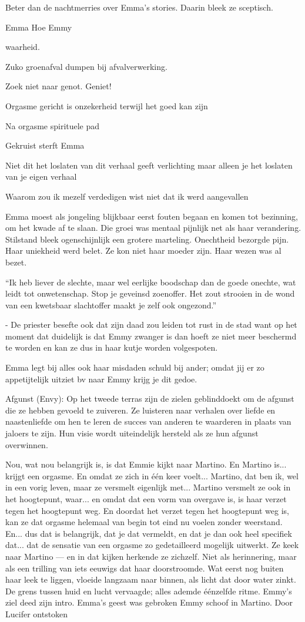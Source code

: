 Beter dan de nachtmerries
over Emma’s stories.
Daarin bleek ze sceptisch.

Emma
Hoe Emmy

waarheid.

Zuko groenafval dumpen bij afvalverwerking.

Zoek niet naar genot. Geniet!

Orgasme gericht is onzekerheid terwijl het goed kan zijn

Na orgasme spirituele pad

Gekruist sterft Emma

Niet dit het loslaten van dit verhaal geeft verlichting maar alleen je het loslaten van je eigen verhaal

Waarom zou ik mezelf verdedigen wist niet dat ik werd aangevallen

Emma moest als jongeling blijkbaar eerst fouten begaan en komen tot bezinning, om het kwade af te slaan. Die groei was mentaal pijnlijk net als haar verandering. Stilstand bleek ogenschijnlijk een grotere marteling. Onechtheid bezorgde pijn. Haar uniekheid werd belet. Ze kon niet haar moeder zijn. Haar wezen was al bezet.

“Ik heb liever de slechte, maar wel eerlijke boodschap dan de goede onechte, wat leidt tot onwetenschap. Stop je geveinsd zoenoffer. Het zout strooien in de wond van een kwetsbaar slachtoffer maakt je zelf ook ongezond.”

- De priester besefte ook dat zijn daad zou leiden tot rust in de stad want op het moment dat duidelijk is dat Emmy zwanger is dan hoeft ze niet meer beschermd te worden en kan ze dus in haar kutje worden volgespoten.

Emma legt bij alles ook haar misdaden schuld bij ander; omdat jij er zo appetijtelijk uitziet bv naar Emmy krijg je dit gedoe.

Afgunst (Envy): Op het tweede terras zijn de zielen geblinddoekt om de afgunst die ze hebben gevoeld te zuiveren. Ze luisteren naar verhalen over liefde en naastenliefde om hen te leren de succes van anderen te waarderen in plaats van jaloers te zijn. Hun visie wordt uiteindelijk hersteld als ze hun afgunst overwinnen.

Nou, wat nou belangrijk is, is dat Emmie kijkt naar Martino. En Martino is... krijgt een orgasme. En omdat ze zich in één keer voelt... Martino, dat ben ik, wel in een vorig leven, maar ze versmelt eigenlijk met... Martino versmelt ze ook in het hoogtepunt, waar... en omdat dat een vorm van overgave is, is haar verzet tegen het hoogtepunt weg. En doordat het verzet tegen het hoogtepunt weg is, kan ze dat orgasme helemaal van begin tot eind nu voelen zonder weerstand. En... dus dat is belangrijk, dat je dat vermeldt, en dat je dan ook heel specifiek dat... dat de sensatie van een orgasme zo gedetailleerd mogelijk uitwerkt.
Ze keek naar Martino — en in dat kijken herkende ze zichzelf.
 Niet als herinnering, maar als een trilling van iets eeuwigs dat haar doorstroomde.
 Wat eerst nog buiten haar leek te liggen, vloeide langzaam naar binnen, als licht dat door water zinkt.
 De grens tussen huid en lucht vervaagde; alles ademde éénzelfde ritme.
Emmy’s ziel deed zijn intro.
Emma’s geest was gebroken
Emmy schoof in Martino.
Door Lucifer ontstoken


